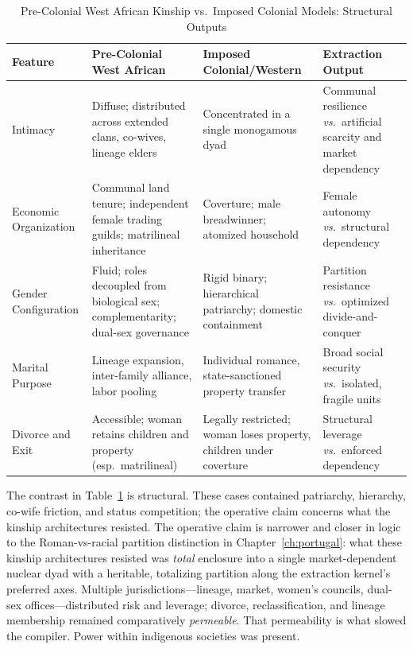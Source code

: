 \begin{table}[H]
\centering
\caption{Pre-Colonial West African Kinship vs.\ Imposed Colonial Models: Structural Outputs}
\label{tab:kinship_comparison}
\small
\begin{tabular}{p{2.5cm} p{3.6cm} p{3.6cm} p{2.8cm}}
\toprule
\textbf{Feature} & \textbf{Pre-Colonial West African} & \textbf{Imposed Colonial/Western} & \textbf{Extraction Output} \\
\midrule
Intimacy & Diffuse; distributed across extended clans, co-wives, lineage elders & Concentrated in a single monogamous dyad & Communal resilience \textit{vs.}\ artificial scarcity and market dependency \\
\addlinespace
Economic Organization & Communal land tenure; independent female trading guilds; matrilineal inheritance & Coverture; male breadwinner; atomized household & Female autonomy \textit{vs.}\ structural dependency \\
\addlinespace
Gender Configuration & Fluid; roles decoupled from biological sex; complementarity; dual-sex governance & Rigid binary; hierarchical patriarchy; domestic containment & Partition resistance \textit{vs.}\ optimized divide-and-conquer \\
\addlinespace
Marital Purpose & Lineage expansion, inter-family alliance, labor pooling & Individual romance, state-sanctioned property transfer & Broad social security \textit{vs.}\ isolated, fragile units \\
\addlinespace
Divorce and Exit & Accessible; woman retains children and property (esp.\ matrilineal) & Legally restricted; woman loses property, children under coverture & Structural leverage \textit{vs.}\ enforced dependency \\
\bottomrule
\end{tabular}
\end{table}

The contrast in Table~\ref{tab:kinship_comparison} is structural. These cases contained patriarchy, hierarchy, co-wife friction, and status competition; the operative claim concerns what the kinship architectures resisted. The operative claim is narrower and closer in logic to the Roman-vs-racial partition distinction in Chapter~\ref{ch:portugal}: what these kinship architectures resisted was \textit{total} enclosure into a single market-dependent nuclear dyad with a heritable, totalizing partition along the extraction kernel's preferred axes. Multiple jurisdictions---lineage, market, women's councils, dual-sex offices---distributed risk and leverage; divorce, reclassification, and lineage membership remained comparatively \textit{permeable}. That permeability is what slowed the compiler. Power within indigenous societies was present.

